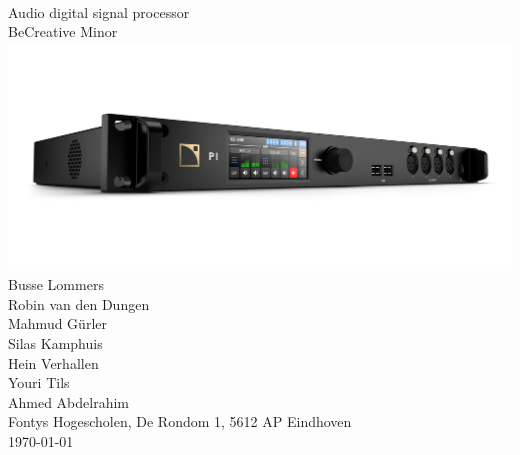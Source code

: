 \documentclass[11pt, a4paper]{report}
\begin{document}
\pagestyle{empty}
\centering
\fontsize{2cm}{2cm}\selectfont{Plan of Approach} \\
\vspace{2mm}
\fontsize{1cm}{1cm}\selectfont Audio digital signal processor \\
\vspace{2mm}
\large BeCreative Minor\\
\normalsize
\vspace{4cm}
\includegraphics[width=\linewidth]{3DR_P1_Perspective.png}\\
\vfill
\normalsize Busse Lommers \\
Robin van den Dungen \\
Mahmud Gürler \\
Silas Kamphuis \\
Hein Verhallen \\
Youri Tils \\
Ahmed Abdelrahim \\
Fontys Hogescholen, De Rondom 1, 5612 AP Eindhoven \\
\today
\end{document}
